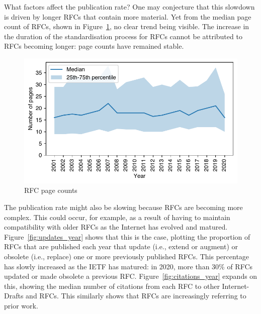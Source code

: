 \documentclass[twocolumn,10pt]{article}
\newlength{\figureWidthOneColumn}
\begin{document}
What factors affect the publication rate?  One may conjecture that this
slowdown is driven by longer RFCs that contain more material. Yet from the
median page count of RFCs, shown in Figure~\ref{fig:pages_year}, no clear
trend being visible. The increase in the duration of the standardisation
process for RFCs cannot be attributed to RFCs becoming longer: page counts
have remained stable. 

\begin{figure}
  \centering
  \includegraphics[width=\figureWidthOneColumn]{figures-prev/imc-2021/documents/page_counts_yearly_dt.pdf}
  \caption{
    RFC page counts
  }
  \label{fig:pages_year}
\end{figure}

The publication rate might also be slowing because RFCs are becoming more
complex. This could occur, for example, as a result of having to maintain
compatibility with older RFCs as the Internet has evolved and matured.
Figure~\ref{fig:updates_year} shows that this is the case, plotting the
proportion of RFCs that are published each year that update (i.e., extend
or augment) or obsolete (i.e., replace) one or more previously published
RFCs.  This percentage has slowly increased as the IETF has matured: in
2020, more than 30\% of RFCs updated or made obsolete a previous RFC.
%
Figure~\ref{fig:citations_year} expands on this, showing the median number
of citations from each RFC to other Internet-Drafts and RFCs. This
similarly shows that RFCs are increasingly referring to prior work.
\end{document}
